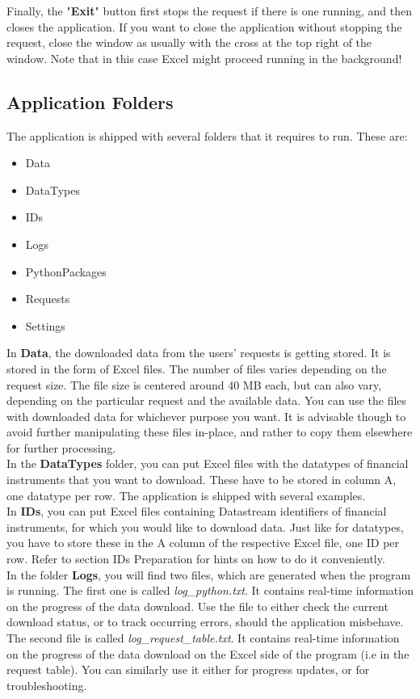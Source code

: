 Finally, the "\textbf{Exit}" button first stops the request if there is one running, and then closes the application. If you want to close the application without stopping the request, close the window as usually with the cross at the top right of the window. Note that in this case Excel might proceed running in the background!

\subsection{Application Folders}
The application is shipped with several folders that it requires to run. These are: 

\begin{itemize}
	\item Data
	\item DataTypes
	\item IDs
	\item Logs
	\item PythonPackages
	\item Requests
	\item Settings
\end{itemize}

In \textbf{Data}, the downloaded data from the users' requests is getting stored. It is stored in the form of Excel files. The number of files varies depending on the request size. The file size is centered around 40 MB each, but can also vary, depending on the particular request and the available data. You can use the files with downloaded data for whichever purpose you want. It is advisable though to avoid further manipulating these files in-place, and rather to copy them elsewhere for further processing. \\

In the \textbf{DataTypes} folder, you can put Excel files with the datatypes of financial instruments that you want to download. These have to be stored in column A, one datatype per row. The application is shipped with several examples. \\

In \textbf{IDs}, you can put Excel files containing Datastream identifiers of financial instruments, for which you would like to download data. Just like for datatypes, you have to store these in the A column of the respective Excel file, one ID per row. Refer to section IDs Preparation for hints on how to do it conveniently. \\

In the folder \textbf{Logs}, you will find two files, which are generated when the program is running. The first one is called \textit{log\_python.txt}. It contains real-time information on the progress of the data download. Use the file to either check the current download status, or to track occurring errors, should the application misbehave. The second file is called \textit{log\_request\_table.txt}. It contains real-time information on the progress of the data download on the Excel side of the program (i.e in the request table). You can similarly use it either for progress updates, or for troubleshooting. \\

